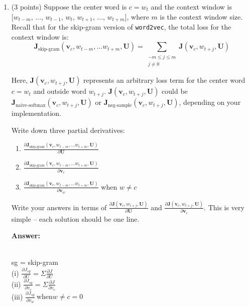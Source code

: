 \documentclass{article}
\newenvironment{answer}{
    {\bf Answer:} \sf \begingroup\color{black}
}{\endgroup}%
\begin{document}
\begin{enumerate}[label=(\alph*)]
\begin{shaded}
\begin{answer}
\end{answer}
\end{shaded}

\item (3 points) Suppose the center word is $c = w_t$ and the context window is $[w_{t-m}$, $\ldots$, $w_{t-1}$, $w_{t}$, $w_{t+1}$, $\ldots$, $w_{t+m}]$, where $m$ is the context window size. Recall that for the  skip-gram version of {\tt word2vec}, the total loss for the context window is:
\begin{equation}
\label{skip-gram}
\bm J_{\textrm{skip-gram}}(\bm v_c, w_{t-m},\ldots w_{t+m}, \bm U) = \sum_{\substack{-m\le j \le m \\ j\ne 0}} \bm J(\bm v_c, w_{t+j}, \bm U)
\end{equation}

Here, $\bm J(\bm v_c, w_{t+j}, \bm U)$ represents an arbitrary loss term for the center word $c=w_t$ and outside word $w_{t+j}$. $\bm J(\bm v_c, w_{t+j}, \bm U)$ could be $\bm J_{\text{naive-softmax}}(\bm v_c, w_{t+j}, \bm U)$ or $\bm J_{\text{neg-sample}}(\bm v_c, w_{t+j}, \bm U)$, depending on your implementation.

Write down three partial derivatives: 
\begin{enumerate}[label=(\roman*)]
    \item ${\frac{\partial \bm J_{\textrm{skip-gram}}(\bm v_c, w_{t-m},\ldots w_{t+m}, \bm U)} {\partial \bm U}}$
    \item ${\frac{\partial \bm J_{\textrm{skip-gram}}(\bm v_c, w_{t-m},\ldots w_{t+m}, \bm U)} {\partial \bm v_c}}$
    \item ${\frac{\partial \bm J_{\textrm{skip-gram}}(\bm v_c, w_{t-m},\ldots w_{t+m}, \bm U)} {\partial \bm v_w}}$ when $w \ne c$
\end{enumerate}
Write your answers in terms of ${\frac{\partial \bm J(\bm v_c, w_{t+j}, \bm U)}{\partial \bm U}}$ and ${\frac{\partial \bm J(\bm v_c, w_{t+j}, \bm U)}{\partial \bm v_c}}$. This is very simple -- each solution should be one line.

\begin{shaded}
\begin{answer}
\\
sg = skip-gram
\\
(i)
    $\frac{\partial J_{sg}}{\partial U} = \Sigma \frac{\partial J}{\partial U}$ \\
(ii)
    $\frac{\partial J_{sg}}{\partial v_c} = \Sigma \frac{\partial J}{\partial v_c}$ \\
(iii)
    $\frac{\partial J_{sg}}{\partial v_w} \ \text{when} w \neq c = 0$
\end{answer}
\end{shaded}


\end{enumerate}
\end{document}
